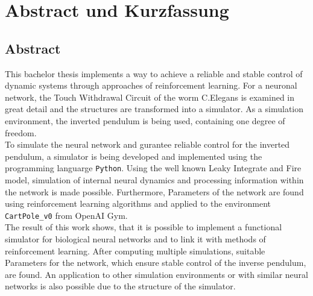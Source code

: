 %
\chapter*{Abstract und Kurzfassung}
%

%
\section*{Abstract}
%
This bachelor thesis implements a way to achieve a reliable and stable control of dynamic systems through approaches of reinforcement learning. For a neuronal network, the \glqq Touch Withdrawal Circuit \grqq{} of the worm C.Elegans is examined in great detail and the structures are transformed into a simulator. As a simulation environment, the inverted pendulum is being used, containing one degree of freedom.\\
To simulate the neural network and gurantee reliable control for the inverted pendulum, a simulator is being developed and implemented using the programming languarge \texttt{Python}. Using the well known Leaky Integrate and Fire model, simulation of internal neural dynamics and processing information within the network is made possible. Furthermore, Parameters of the network are found using reinforcement learning algorithms and applied to the environment \texttt{CartPole\_v0} from OpenAI Gym.\\
The result of this work shows, that it is possible to implement a functional simulator for biological neural networks and to link it with methods of reinforcement learning. After computing multiple simulations, suitable Parameters for the network, which ensure stable control of the inverse pendulum, are found. An application to other simulation environments or with similar neural networks is also possible due to the structure of the simulator.


%
